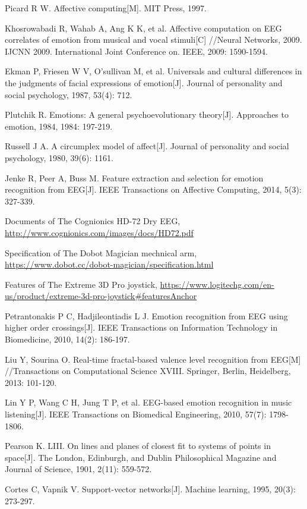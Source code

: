 \documentclass[runningheads,a4paper]{llncs}
\begin{document}
\begin{thebibliography}{4}

 Picard R W.
  Affective computing[M].
   MIT Press, 1997.

 Khosrowabadi R, Wahab A, Ang K K, et al.
Affective computation on EEG correlates of emotion from musical and vocal stimuli[C]
//Neural Networks, 2009. IJCNN 2009. International Joint Conference on. IEEE, 2009: 1590-1594.

 Ekman P, Friesen W V, O'sullivan M, et al.
Universals and cultural differences in the judgments of facial expressions of emotion[J].
Journal of personality and social psychology, 1987, 53(4): 712.

 Plutchik R.
Emotions: A general psychoevolutionary theory[J].
Approaches to emotion, 1984, 1984: 197-219.

 Russell J A.
A circumplex model of affect[J].
Journal of personality and social psychology, 1980, 39(6): 1161.

 Jenke R, Peer A, Buss M.
Feature extraction and selection for emotion recognition from EEG[J].
IEEE Transactions on Affective Computing, 2014, 5(3): 327-339.

 Documents of The Cognionics HD-72 Dry EEG,
\url{http://www.cognionics.com/images/docs/HD72.pdf}

 Specification of The Dobot Magician mechnical arm,
\url{https://www.dobot.cc/dobot-magician/specification.html}

 Features of The Extreme 3D Pro joystick,
\url{https://www.logitechg.com/en-us/product/extreme-3d-pro-joystick#featuresAnchor}

 Petrantonakis P C, Hadjileontiadis L J.
Emotion recognition from EEG using higher order crossings[J].
IEEE Transactions on Information Technology in Biomedicine, 2010, 14(2): 186-197.

 Liu Y, Sourina O.
Real-time fractal-based valence level recognition from EEG[M]
//Transactions on Computational Science XVIII. Springer, Berlin, Heidelberg, 2013: 101-120.

 Lin Y P, Wang C H, Jung T P, et al.
 EEG-based emotion recognition in music listening[J].
 IEEE Transactions on Biomedical Engineering, 2010, 57(7): 1798-1806.

  Pearson K. LIII.
 On lines and planes of closest fit to systems of points in space[J].
 The London, Edinburgh, and Dublin Philosophical Magazine and Journal of Science, 1901, 2(11): 559-572.

 Cortes C, Vapnik V.
Support-vector networks[J].
Machine learning, 1995, 20(3): 273-297.
\end{thebibliography}
\end{document}
